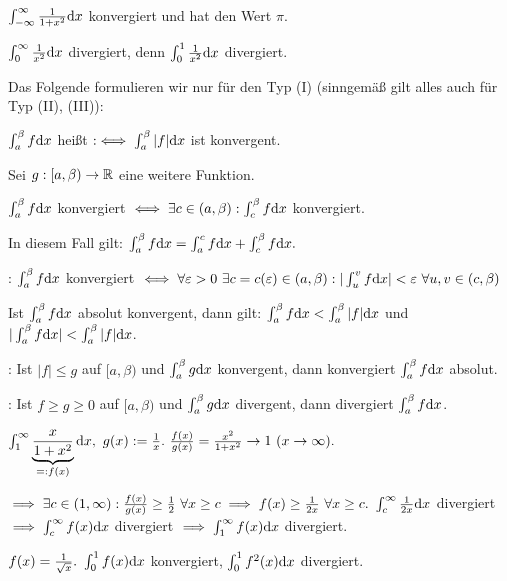 \documentclass[a4paper,oneside,DIV15,BCOR12mm]{scrbook}
\begin{document}
\begin{beispiele}
\item $\int_{-\infty}^\infty\frac{1}{1+x^2}\text{d}x$ konvergiert und hat den Wert $\pi$.

\item $\int_0^\infty \frac{1}{x^2}\text{d}x$ divergiert, denn $\int_0^1 \frac{1}{x^2}\text{d}x$ divergiert.
\end{beispiele}

Das Folgende formulieren wir nur für den Typ (I) (sinngemäß gilt alles auch für Typ (II), (III)):

\begin{definition}
$\int_a^\beta f\text{d}x$ heißt  $:\iff \int_a^\beta |f|\text{d}x$ ist konvergent.
\end{definition}

\begin{satz*}
Sei $g:[a,\beta) \to \mathbb{R}$ eine weitere Funktion.
\begin{liste}
\item $\int_a^\beta f\text{d}x$ konvergiert $\iff \exists c \in (a,\beta): \int_c^\beta f\text{d}x$ konvergiert.

In diesem Fall gilt: $\int_a^\beta f\text{d}x = \int_a^c f\text{d}x + \int_c^\beta f\text{d}x.$

\item {}: $\int_a^\beta f\text{d}x$ konvergiert $\iff \forall \varepsilon>0\ \exists c=c(\varepsilon) \in (a,\beta): |\int_u^v f\text{d}x| < \varepsilon\ \forall u,v \in (c,\beta)$

\item Ist $\int_a^\beta f\text{d}x$ absolut konvergent, dann gilt: $\int_a^\beta f\text{d}x < \int_a^\beta |f|\text{d}x$ und $|\int_a^\beta f\text{d}x| < \int_a^\beta |f|\text{d}x$.

\item {}: Ist $|f| \le g$ auf $[a,\beta)$ und $\int_a^\beta g\text{d}x$ konvergent, dann konvergiert $\int_a^\beta f\text{d}x$ absolut.

\item {}: Ist $f \ge g \ge 0$ auf $[a,\beta)$ und $\int_a^\beta g\text{d}x$ divergent, dann divergiert $\int_a^\beta f\text{d}x$.
\end{liste}
\end{satz*}

\begin{beispiele}
\item $\int_1^\infty \underbrace{\frac{x}{1+x^2}}_{=:f(x)}\dx,\ g(x) := \frac{1}{x}.\ \frac{f(x)}{g(x)} = \frac{x^2}{1+x^2} \to 1\ (x\to\infty).$

$\implies \exists c \in (1,\infty): \frac{f(x)}{g(x)} \ge \frac{1}{2}\ \forall x \ge c \implies f(x) \ge \frac{1}{2x}\ \forall x \ge c.\ \int_c^\infty \frac{1}{2x}\text{d}x$ divergiert $\implies \int_c^\infty f(x)\text{d}x$ divergiert $\implies \int_1^\infty f(x)\text{d}x$ divergiert.

\item $f(x) = \frac{1}{\sqrt{x}}.\ \int_0^1 f(x)\text{d}x$ konvergiert, $\int_0^1 f^2(x)\text{d}x$ divergiert.
\end{beispiele}
\end{document}
